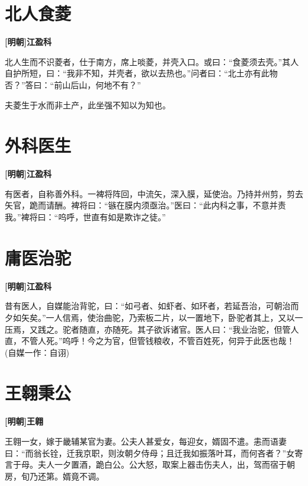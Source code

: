 \documentclass[UTF8,titlepage,oneside]{ctexbook}
\begin{document}
\chapter*{北人食菱}
\begin{center}
	\textbf{[明朝]江盈科}
\end{center}

北人生而不识菱者，仕于南方，席上啖菱，并壳入口。或曰：“食菱须去壳。”其人自护所短，曰：“我非不知，并壳者，欲以去热也。”问者曰：“北土亦有此物否？”答曰：“前山后山，何地不有？”

夫菱生于水而非土产，此坐强不知以为知也。


\chapter*{外科医生}
\begin{center}
	\textbf{[明朝]江盈科}
\end{center}

有医者，自称善外科。一裨将阵回，中流矢，深入膜，延使治。乃持并州剪，剪去矢官，跪而请酬。裨将曰：“镞在膜内须亟治。”医曰：“此内科之事，不意并责我。”裨将曰：“呜呼，世直有如是欺诈之徒。”


\chapter*{庸医治驼}
\begin{center}
	\textbf{[明朝]江盈科}
\end{center}

昔有医人，自媒能治背驼，曰：“如弓者、如虾者、如环者，若延吾治，可朝治而夕如矢矣。”一人信焉，使治曲驼，乃索板二片，以一置地下，卧驼者其上，又以一压焉，又践之。驼者随直，亦随死。其子欲诉诸官。医人曰：“我业治驼，但管人直，不管人死。”呜呼！今之为官，但管钱粮收，不管百姓死，何异于此医也哉！(自媒一作：自诩)


\chapter*{王翱秉公}
\begin{center}
	\textbf{[明朝]王翱}
\end{center}

王翱一女，嫁于畿辅某官为妻。公夫人甚爱女，每迎女，婿固不遣。恚而语妻曰：“而翁长铨，迁我京职，则汝朝夕侍母；且迁我如振落叶耳，而何吝者？”女寄言于母。夫人一夕置酒，跪白公。公大怒，取案上器击伤夫人，出，驾而宿于朝房，旬乃还第。婿竟不调。
\end{document}
